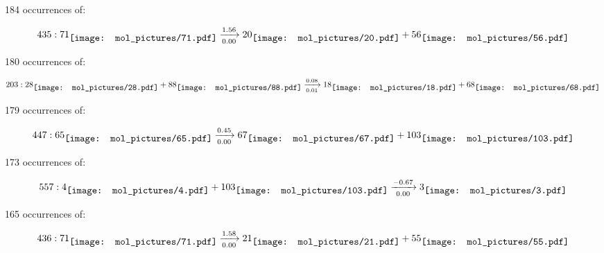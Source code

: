 \documentclass{article}
\begin{document}
\vspace{1cm}


184 occurrences of:

$$
435:  
71
\raisebox{-.5\height}{\texttt{[image: mol\_pictures/71.pdf]}}
\xrightarrow[0.00]{1.56}
20
\raisebox{-.5\height}{\texttt{[image: mol\_pictures/20.pdf]}}
+
56
\raisebox{-.5\height}{\texttt{[image: mol\_pictures/56.pdf]}}
$$



\vspace{1cm}


180 occurrences of:

$$
203:  
28
\raisebox{-.5\height}{\texttt{[image: mol\_pictures/28.pdf]}}
+
88
\raisebox{-.5\height}{\texttt{[image: mol\_pictures/88.pdf]}}
\xrightarrow[0.01]{0.08}
18
\raisebox{-.5\height}{\texttt{[image: mol\_pictures/18.pdf]}}
+
68
\raisebox{-.5\height}{\texttt{[image: mol\_pictures/68.pdf]}}
$$



\vspace{1cm}


179 occurrences of:

$$
447:  
65
\raisebox{-.5\height}{\texttt{[image: mol\_pictures/65.pdf]}}
\xrightarrow[0.00]{0.45}
67
\raisebox{-.5\height}{\texttt{[image: mol\_pictures/67.pdf]}}
+
103
\raisebox{-.5\height}{\texttt{[image: mol\_pictures/103.pdf]}}
$$



\vspace{1cm}


173 occurrences of:

$$
557:  
4
\raisebox{-.5\height}{\texttt{[image: mol\_pictures/4.pdf]}}
+
103
\raisebox{-.5\height}{\texttt{[image: mol\_pictures/103.pdf]}}
\xrightarrow[0.00]{-0.67}
3
\raisebox{-.5\height}{\texttt{[image: mol\_pictures/3.pdf]}}
$$



\vspace{1cm}


165 occurrences of:

$$
436:  
71
\raisebox{-.5\height}{\texttt{[image: mol\_pictures/71.pdf]}}
\xrightarrow[0.00]{1.58}
21
\raisebox{-.5\height}{\texttt{[image: mol\_pictures/21.pdf]}}
+
55
\raisebox{-.5\height}{\texttt{[image: mol\_pictures/55.pdf]}}
$$
\end{document}
